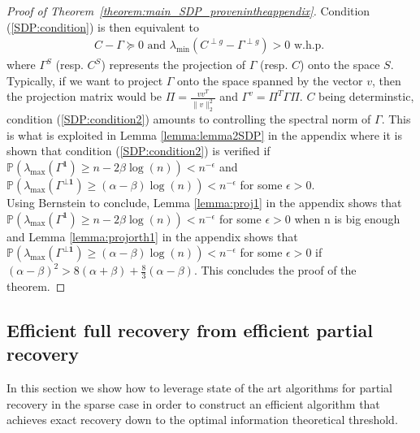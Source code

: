 \documentclass[english]{article}
\newcommand{\1}{\textbf{1}}
\newcommand{\p}{\mathbb{P}}
\begin{document}
\begin{proof}[Proof of Theorem~\ref{theorem:main_SDP_provenintheappendix}]
Condition (\ref{SDP:condition}) is then equivalent to
\begin{align} \label{SDP:condition2}
C-\Gamma \succeq 0 \text{ and } \lambda_{\min}\left( C^{\perp g}-\Gamma^{\perp g}\right)>0 \text{ w.h.p.\ }
\end{align}
where $\Gamma^S$ (resp. $C^S$) represents the projection of $\Gamma$ (resp. $C$) onto the space $S$. Typically, if we want to project $\Gamma$ onto the space spanned by the vector $v$, then the projection matrix would be $\Pi=\frac{vv^T}{\|v\|_{2}^2}$ and $\Gamma^{v}=\Pi^T \Gamma \Pi$. $C$ being determinstic, condition (\ref{SDP:condition2}) amounts to controlling the spectral norm of $\Gamma$. This is what is exploited in Lemma \ref{lemma:lemma2SDP} in the appendix where it is shown that condition (\ref{SDP:condition2}) is verified if $\p\left(\lambda_{\max}(\Gamma^\1) \geq n-2\beta\log(n)\right)<n^{-\epsilon}$ and $\p\left(\lambda_{\max}(\Gamma^{\perp \1}) \geq (\alpha-\beta) \log(n)\right)< n^{-\epsilon}$ for some $\epsilon>0$.\\

Using Bernstein to conclude, Lemma \ref{lemma:proj1} in the appendix shows that $\p\left(\lambda_{\max}(\Gamma^\1) \geq n-2\beta\log(n)\right)<n^{-\epsilon}$  for some $\epsilon >0$ when n is big enough and Lemma \ref{lemma:projorth1} in the appendix shows that  $\p\left(\lambda_{\max}(\Gamma^{\perp \1}) \geq (\alpha-\beta) \log(n)\right)< n^{-\epsilon}$ for some $\epsilon>0$ if $(\alpha-\beta)^2>8(\alpha+\beta)+\frac{8}{3}(\alpha-\beta)$. This concludes the proof of the theorem.

\end{proof}



\subsection{Efficient full recovery from efficient partial recovery}\label{black}

In this section we show how to leverage state of the art algorithms for partial recovery in the sparse case in order to construct an efficient algorithm that achieves exact recovery down to the optimal information theoretical threshold.\\
\end{document}

